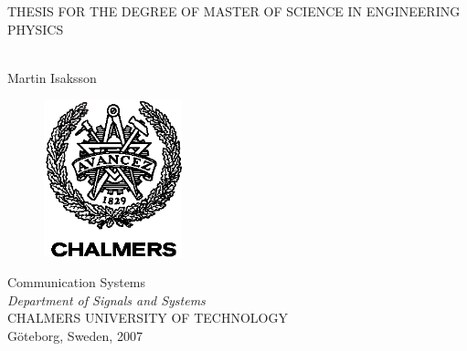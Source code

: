 \begin{titlepage}
\begin{center}

\textsc{\small{THESIS FOR THE DEGREE OF MASTER OF SCIENCE IN ENGINEERING PHYSICS}}

\vspace{3cm}

\textbf{\huge{\thesistitlebroken}}\\
\vspace{1.5cm}
\LARGE{Martin Isaksson}

\vspace{3cm}

\begin{figure}[!h]
  \begin{center}
  \includegraphics[width=4cm]{images/AvancezCHALMERSx.eps}
  \end{center}
\end{figure}

\vspace{3.5cm}
\enlargethispage{2cm}
\normalsize{
Communication Systems\\
\textit{Department of Signals and Systems}\\
\textsc{CHALMERS UNIVERSITY OF TECHNOLOGY}\\
G\"{o}teborg, Sweden, 2007}
\end{center}
\end{titlepage}